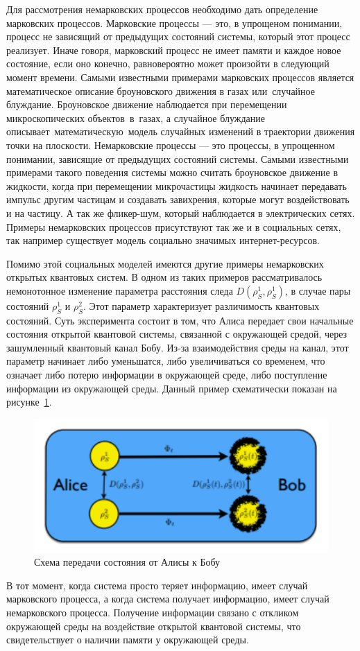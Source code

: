 Для рассмотрения немарковских процессов необходимо дать определение марковских процессов.
Марковские процессы — это, в упрощеном понимании, процесс не зависящий от предыдущих состояний системы,
который этот процесс реализует.
Иначе говоря, марковский процесс не имеет памяти и каждое новое состояние, если оно конечно, равновероятно
может произойти в следующий момент времени.
Самыми известными примерами марковских процессов является математическое описание броуновского движения
в газах или~случайное блуждание.
Броуновское движение наблюдается при перемещении микроскопических объектов~в~газах, а случайное блуждание
описывает~математическую~модель случайных изменений в траектории движения точки на плоскости.
Немарковские процессы — это процессы, в упрощенном понимании, зависящие от предыдущих состояний системы.
Самыми известными примерами такого поведения системы можно считать броуновское движение в жидкости,
когда при перемещении микрочастицы жидкость начинает передавать импульс другим частицам и создавать
завихрения, которые могут воздействовать и на частицу.
А так же фликер-шум, который наблюдается в электрических сетях.
Примеры немарковских процессов присутствуют так же и в социальных сетях, так например существует
модель социально значимых интернет-ресурсов.

Помимо этой социальных моделей имеются другие примеры немарковских открытых квантовых систем.
В одном из таких примеров рассматривалось немонотонное изменение параметра расстояния следа
$D(\rho^{1}_{S}, \rho^{1}_{S})$, в случае пары состояний $\rho^{1}_{S}$ и $\rho^{2}_{S}$.
Этот параметр характеризует различимость квантовых состояний.
Суть эксперимента состоит в том, что Алиса передает свои начальные состояния открытой квантовой
системы, связанной с окружающей средой, через зашумленный квантовый канал Бобу.
Из-за взаимодействия среды на канал, этот параметр начинает либо уменьшатся, либо увеличиваться со временем,
что означает либо потерю информации в окружающей среде, либо поступление информации из окружающей среды.
Данный пример схематически показан на рисунке~\ref{fig:state_from_alice_to_bob}.
\begin{figure}[h!]
    \centering
    \captionsetup{justification=centering}
    \includegraphics[width=0.7\linewidth]{pictures/state_alice_bob.png}
    \caption{Схема передачи состояния от Алисы к Бобу}
    \label{fig:state_from_alice_to_bob}
\end{figure}
В тот момент, когда система просто теряет информацию, имеет случай марковского процесса, а когда
система получает информацию, имеет случай немарковского процесса.
Получение информации связано с откликом окружающей среды на воздействие открытой квантовой системы,
что свидетельствует о наличии памяти у окружающей среды.

